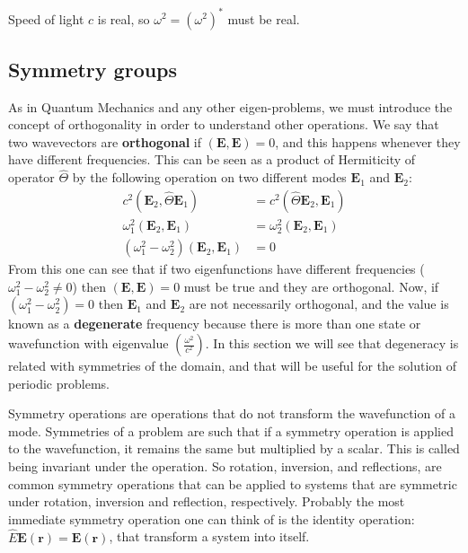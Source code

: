 Speed of light $c$ is real, so $\omega^2 = \left(\omega^2\right)^*$ must be real.

\subsection{Symmetry groups}

As in Quantum Mechanics and any other eigen-problems, we must introduce the concept of orthogonality in order to understand other operations.
We say that two wavevectors are \textbf{orthogonal} if $\left(\mathbf{E},\mathbf{E}\right) = 0$, and this happens whenever they have different frequencies. This can be seen as a product of Hermiticity of operator $\hat{\Theta}$ by the following operation on two different modes $\mathbf{E}_1$ and $\mathbf{E}_2$:
\begin{align*}
c^2\left(\mathbf{E}_2,\hat{\Theta}\mathbf{E}_1\right) &=
c^2\left(\hat{\Theta}\mathbf{E}_2,\mathbf{E}_1\right) \\
\omega_1^2\left(\mathbf{E}_2,\mathbf{E}_1\right) &= \omega_2^2\left(\mathbf{E}_2,\mathbf{E}_1\right) \\
\left(\omega_1^2-\omega_2^2\right) \left(\mathbf{E}_2,\mathbf{E}_1\right) &= 0
\end{align*}
From this one can see that if two eigenfunctions have different frequencies ($\omega_1^2-\omega_2^2\neq 0$) then $\left(\mathbf{E},\mathbf{E}\right) = 0$
must be true and they are orthogonal.
Now, if $\left(\omega_1^2-\omega_2^2\right) = 0$ then $\mathbf{E}_1$ and $\mathbf{E}_2$ are not necessarily orthogonal, and the value is known as a \textbf{degenerate} frequency because there is more than one state or wavefunction with eigenvalue $\left(\frac{\omega^2}{c^2}\right)$. In this section we will see that degeneracy is related with symmetries of the domain, and that will be useful for the solution of periodic problems.  

Symmetry operations are operations that do not transform the wavefunction of a mode. Symmetries of a problem are such that if a symmetry operation is applied to the wavefunction, it remains the same but multiplied by a scalar. This is called being invariant under the operation.
So rotation, inversion, and reflections, are common symmetry operations that can be applied to systems that are symmetric under rotation, inversion and reflection, respectively. 
Probably the most immediate symmetry operation one can think of is the identity operation:
$\hat{E}\mathbf{E(r)} = \mathbf{E(r)}$, that transform a system into itself.

